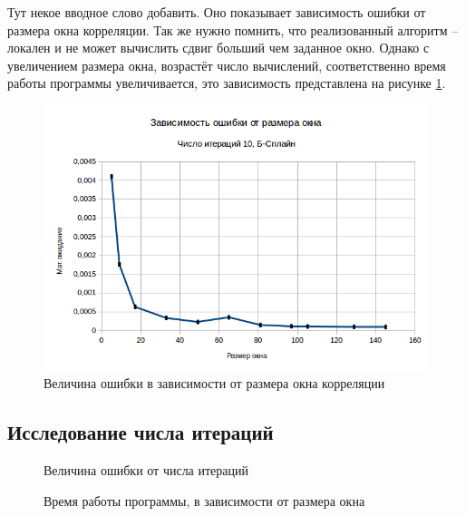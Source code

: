 Тут некое вводное слово добавить. Оно показывает зависимость ошибки от размера окна корреляции. Так же нужно помнить, что реализованный алгоритм – локален и не может вычислить сдвиг больший чем заданное окно. Однако с увеличением размера окна, возрастёт число вычислений, соответственно время работы программы увеличивается, это зависимость представлена на рисунке \ref{fig:window_error}.
\begin{figure}
\centering
\includegraphics[width=0.7\linewidth]{images/window_error}
\caption{Величина ошибки в зависимости от размера окна корреляции}
\label{fig:window_error}
\end{figure}

\subsection{Исследование числа итераций}
\begin{figure}[h!]
\caption{Величина ошибки от числа итераций}
\label{fig:window_size}
\end{figure}

\begin{figure}[h!]
\caption{Время работы программы, в зависимости от размера окна}
\label{pic:window_iter}
\end{figure}